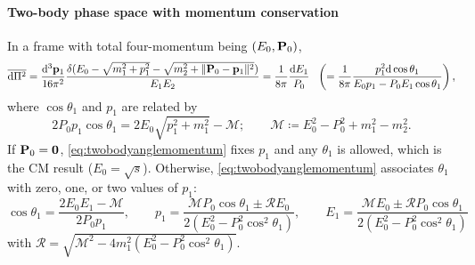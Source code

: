 \documentclass[CheatSheet]{subfiles}
\begin{document}
\paragraph{Two-body phase space with momentum conservation}
In a frame with total four-momentum being $(E_0,{\mathbf{P}}_0)$,
\begin{equation}
\overline{{\mathrm{d}}\Pi^2}
=\frac{{\mathrm{d}}^3{\mathbf{p}}_1}{16\pi^2}\frac{\delta(E_0-\sqrt{m_1^2+p_1^2}-\sqrt{m_2^2+\|{\mathbf{P}}_0-{\mathbf{p}}_1\|^2})}{E_1E_2}
=\frac{1}{8\pi}\frac{{\mathrm{d}} E_1}{P_0}
~~\left(=\frac{1}{8\pi}\frac{p_1^2{\mathrm{d}}\cos\theta_{1}}{E_0p_1-P_0E_1\cos\theta_1}\right),
\label{eq:twobodypsgeneral}
\end{equation}
where $\cos\theta_1$ and $p_1$ are related by
\begin{equation}
 2P_0 p_1\cos\theta_1 = 2E_0 \sqrt{p_1^2+m_1^2}-\mathcal M;
\qquad \mathcal M \coloneq  E_0^2 - P_0^2 +  m_1^2 - m_2^2.
\label{eq:twobodyanglemomentum}
\end{equation}
If ${\mathbf{P}}_0={\mathbf{0}}$, \cref{eq:twobodyanglemomentum} fixes $p_1$ and any $\theta_1$ is allowed, which is the CM result ($E_0=\sqrt s$).
Otherwise, \cref{eq:twobodyanglemomentum} associates $\theta_1$ with zero, one, or two values of $p_1$:
\begin{equation}
 \cos\theta_1 = \frac{2E_0E_1-\mathcal M}{2P_0p_1},\qquad
p_1=\frac{\mathcal MP_0\cos\theta_1
 \pm \mathcal R E_0
}{2(E_0^2-P_0^2\cos^2\theta_1)},\qquad
E_1=\frac{\mathcal ME_0
 \pm \mathcal RP_0\cos\theta_1
}{2(E_0^2-P_0^2\cos^2\theta_1)}
\end{equation}
with $\mathcal R = \sqrt{\mathcal M^2-4m_1^2(E_0^2-P_0^2\cos^2\theta_1)}$.
\end{document}
